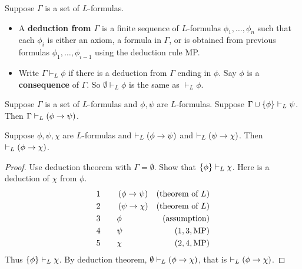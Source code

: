 \pagebreak


\begin{definition}
Suppose $ \Gamma $ is a set of $ L $-formulas.
\begin{itemize}
\item A \textbf{deduction from $ \Gamma $} is a finite sequence of $ L $-formulas $ \phi_1, \dots, \phi_n $ such that each $ \phi_i $ is either an axiom, a formula in $ \Gamma $, or is obtained from previous formulas $ \phi_1, \dots, \phi_{i - 1} $ using the deduction rule MP.
\item Write $ \Gamma \vdash_L \phi $ if there is a deduction from $ \Gamma $ ending in $ \phi $. Say $ \phi $ is a \textbf{consequence} of $ \Gamma $. So $ \emptyset \vdash_L \phi $ is the same as $ \vdash_L \phi $.
\end{itemize}
\end{definition}

\begin{theorem}
\label{thm:1.2.5}
Suppose $ \Gamma $ is a set of $ L $-formulas and $ \phi, \psi $ are $ L $-formulas. Suppose $ \Gamma \cup \left\{ \phi \right\} \vdash_L \psi $. Then $ \Gamma \vdash_L \left( \phi \rightarrow \psi \right) $.
\end{theorem}

\begin{corollary}
Suppose $ \phi, \psi, \chi $ are $ L $-formulas and $ \vdash_L \left( \phi \rightarrow \psi \right) $ and $ \vdash_L \left( \psi \rightarrow \chi \right) $. Then $ \vdash_L \left( \phi \rightarrow \chi \right) $.
\end{corollary}

\begin{proof}
Use deduction theorem with $ \Gamma = \emptyset $. Show that $ \left\{ \phi \right\} \vdash_L \chi $. Here is a deduction of $ \chi $ from $ \phi $.
\begin{align*}
1 \qquad & \left( \phi \rightarrow \psi \right) & \left( \text{theorem of} \ L \right) \\
2 \qquad & \left( \psi \rightarrow \chi \right) & \left( \text{theorem of} \ L \right) \\
3 \qquad & \phi & \left( \text{assumption} \right) \\
4 \qquad & \psi & \left( 1, 3, \text{MP} \right) \\
5 \qquad & \chi & \left( 2, 4, \text{MP} \right)
\end{align*}
Thus $ \left\{ \phi \right\} \vdash_L \chi $. By deduction theorem, $ \emptyset \vdash_L \left( \phi \rightarrow \chi \right) $, that is $ \vdash_L \left( \phi \rightarrow \chi \right) $.
\end{proof}


